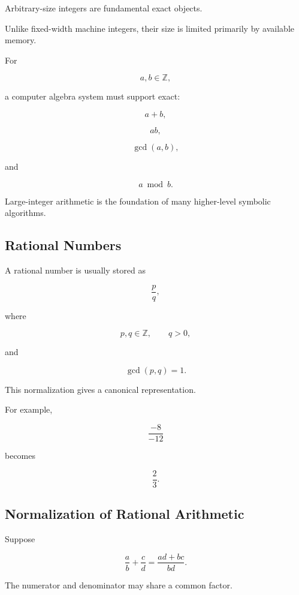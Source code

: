 Arbitrary-size integers are fundamental exact objects.

Unlike fixed-width machine integers, their size is limited primarily by
available memory.

For

\[
a,b\in\mathbb{Z},
\]

a computer algebra system must support exact:

\[
\boxed{
a+b,
}
\]

\[
\boxed{
ab,
}
\]

\[
\boxed{
\gcd(a,b),
}
\]

and

\[
\boxed{
a\bmod b.
}
\]

Large-integer arithmetic is the foundation of many higher-level symbolic
algorithms.

\subsection{Rational Numbers}
\label{subsec:computer-algebra-rationals}

A rational number is usually stored as

\[
\boxed{
\frac{p}{q},
}
\]

where

\[
p,q\in\mathbb{Z},
\qquad
q>0,
\]

and

\[
\boxed{
\gcd(p,q)=1.
}
\]

This normalization gives a canonical representation.

For example,

\[
\frac{-8}{-12}
\]

becomes

\[
\boxed{
\frac23.
}
\]

\subsection{Normalization of Rational Arithmetic}
\label{subsec:rational-normalization}

Suppose

\[
\frac{a}{b}
+
\frac{c}{d}
=
\frac{
ad+bc
}{
bd
}.
\]

The numerator and denominator may share a common factor.

